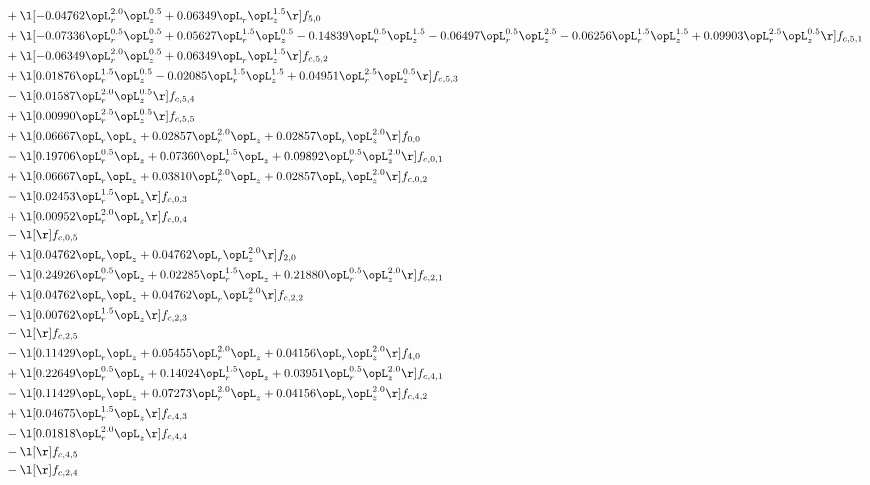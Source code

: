 \begin{alignat}{2}
& + \l[  -0.04762 \opL_r^{2.0} \opL_z^{0.5} +  0.06349 \opL_r \opL_z^{1.5}  \r] f_{5,0} \nonumber \\ 
& + \l[  -0.07336 \opL_r^{0.5} \opL_z^{0.5} +  0.05627 \opL_r^{1.5} \opL_z^{0.5}   -0.14839 \opL_r^{0.5} \opL_z^{1.5}   -0.06497 \opL_r^{0.5} \opL_z^{2.5}   -0.06256 \opL_r^{1.5} \opL_z^{1.5} +  0.09903 \opL_r^{2.5} \opL_z^{0.5}  \r] f_{c,5,1} \nonumber \\ 
& + \l[  -0.06349 \opL_r^{2.0} \opL_z^{0.5} +  0.06349 \opL_r \opL_z^{1.5}  \r] f_{c,5,2} \nonumber \\ 
& + \l[  0.01876 \opL_r^{1.5} \opL_z^{0.5}   -0.02085 \opL_r^{1.5} \opL_z^{1.5} +  0.04951 \opL_r^{2.5} \opL_z^{0.5}  \r] f_{c,5,3} \nonumber \\ 
& - \l[  0.01587 \opL_r^{2.0} \opL_z^{0.5}  \r] f_{c,5,4} \nonumber \\ 
& + \l[  0.00990 \opL_r^{2.5} \opL_z^{0.5}  \r] f_{c,5,5} \nonumber \\ 
& + \l[  0.06667 \opL_r \opL_z +  0.02857 \opL_r^{2.0} \opL_z +  0.02857 \opL_r \opL_z^{2.0}  \r] f_{0,0} \nonumber \\ 
& - \l[  0.19706 \opL_r^{0.5} \opL_z +  0.07360 \opL_r^{1.5} \opL_z +  0.09892 \opL_r^{0.5} \opL_z^{2.0}  \r] f_{c,0,1} \nonumber \\ 
& + \l[  0.06667 \opL_r \opL_z +  0.03810 \opL_r^{2.0} \opL_z +  0.02857 \opL_r \opL_z^{2.0}  \r] f_{c,0,2} \nonumber \\ 
& - \l[  0.02453 \opL_r^{1.5} \opL_z  \r] f_{c,0,3} \nonumber \\ 
& + \l[  0.00952 \opL_r^{2.0} \opL_z  \r] f_{c,0,4} \nonumber \\ 
& - \l[  \r] f_{c,0,5} \nonumber \\ 
& + \l[  0.04762 \opL_r \opL_z +  0.04762 \opL_r \opL_z^{2.0}  \r] f_{2,0} \nonumber \\ 
& - \l[  0.24926 \opL_r^{0.5} \opL_z +  0.02285 \opL_r^{1.5} \opL_z +  0.21880 \opL_r^{0.5} \opL_z^{2.0}  \r] f_{c,2,1} \nonumber \\ 
& + \l[  0.04762 \opL_r \opL_z +  0.04762 \opL_r \opL_z^{2.0}  \r] f_{c,2,2} \nonumber \\ 
& - \l[  0.00762 \opL_r^{1.5} \opL_z  \r] f_{c,2,3} \nonumber \\ 
& - \l[  \r] f_{c,2,5} \nonumber \\ 
& - \l[  0.11429 \opL_r \opL_z +  0.05455 \opL_r^{2.0} \opL_z +  0.04156 \opL_r \opL_z^{2.0}  \r] f_{4,0} \nonumber \\ 
& + \l[  0.22649 \opL_r^{0.5} \opL_z +  0.14024 \opL_r^{1.5} \opL_z +  0.03951 \opL_r^{0.5} \opL_z^{2.0}  \r] f_{c,4,1} \nonumber \\ 
& - \l[  0.11429 \opL_r \opL_z +  0.07273 \opL_r^{2.0} \opL_z +  0.04156 \opL_r \opL_z^{2.0}  \r] f_{c,4,2} \nonumber \\ 
& + \l[  0.04675 \opL_r^{1.5} \opL_z  \r] f_{c,4,3} \nonumber \\ 
& - \l[  0.01818 \opL_r^{2.0} \opL_z  \r] f_{c,4,4} \nonumber \\ 
& - \l[  \r] f_{c,4,5} \nonumber \\ 
& - \l[  \r] f_{c,2,4} \nonumber \\ 
\end{alignat} 


